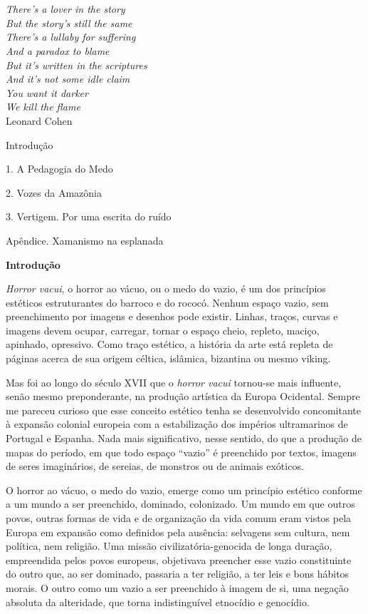 \chapter*{}

\begin{vplace}[30]
\begin{flushright}
\emph{There's a lover in the story\\
But the story's still the same\\
There's a lullaby for suffering\\
And a paradox to blame\\
But it's written in the scriptures\\
And it's not some idle claim\\
You want it darker\\
We kill the flame}\\[5pt]
Leonard Cohen
\end{flushright}
\end{vplace}

Introdução

1. A Pedagogia do Medo

2. Vozes da Amazônia

3. Vertigem. Por uma escrita do ruído

Apêndice. Xamanismo na esplanada

\textbf{Introdução}

\emph{Horror vacui}, o horror ao vácuo, ou o medo do vazio, é um dos
princípios estéticos estruturantes do barroco e do rococó. Nenhum espaço
vazio, sem preenchimento por imagens e desenhos pode existir. Linhas,
traços, curvas e imagens devem ocupar, carregar, tornar o espaço cheio,
repleto, maciço, apinhado, opressivo. Como traço estético, a história da
arte está repleta de páginas acerca de sua origem céltica, islâmica,
bizantina ou mesmo viking.

Mas foi ao longo do século XVII que o \emph{horror vacui} tornou-se mais
influente, senão mesmo preponderante, na produção artística da Europa
Ocidental. Sempre me pareceu curioso que esse conceito estético tenha se
desenvolvido concomitante à expansão colonial europeia com a
estabilização dos impérios ultramarinos de Portugal e Espanha. Nada mais
significativo, nesse sentido, do que a produção de mapas do período, em
que todo espaço ``vazio'' é preenchido por textos, imagens de seres
imaginários, de sereias, de monstros ou de animais exóticos.

O horror ao vácuo, o medo do vazio, emerge como um princípio estético
conforme a um mundo a ser preenchido, dominado, colonizado. Um mundo em
que outros povos, outras formas de vida e de organização da vida comum
eram vistos pela Europa em expansão como definidos pela ausência:
selvagens sem cultura, nem política, nem religião. Uma missão
civilizatória-genocida de longa duração, empreendida pelos povos
europeus, objetivava preencher esse vazio constituinte do outro que, ao
ser dominado, passaria a ter religião, a ter leis e bons hábitos morais.
O outro como um vazio a ser preenchido à imagem de si, uma negação
absoluta da alteridade, que torna indistinguível etnocídio e genocídio.

